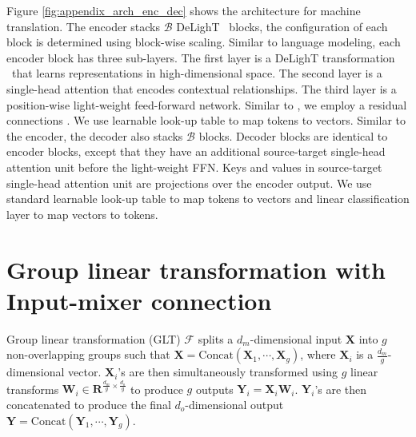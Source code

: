 \vspace{1mm}
 Figure \ref{fig:appendix_arch_enc_dec} shows the architecture for machine translation. The encoder stacks $\mathcal{B}$ DeLighT ~blocks, the configuration of each block is determined using block-wise scaling. Similar to language modeling, each encoder block has three sub-layers. The first layer is a DeLighT transformation ~that learns representations in high-dimensional space. The second layer is a single-head attention that encodes contextual relationships. The third layer is a position-wise light-weight feed-forward network. Similar to \citet{vaswani2017attention}, we employ a residual connections \citep{he2016deep}. We use learnable look-up table to map tokens to vectors. Similar to the encoder, the decoder also stacks  $\mathcal{B}$ blocks. Decoder blocks are identical to encoder blocks, except that they have an additional source-target single-head attention unit before the light-weight FFN. Keys and values in source-target single-head attention unit are projections over the encoder output. We use standard learnable look-up table to map tokens to vectors and linear classification layer to map vectors to tokens. 

\section{Group linear transformation with Input-mixer connection}
\label{sec:glt_explain}
Group linear transformation (GLT) $\mathcal{F}$ splits a $d_m$-dimensional input $\mathbf{X}$ into $g$ non-overlapping groups such that $\mathbf{X} = \text{Concat}(\mathbf{X}_1, \cdots, \mathbf{X}_g)$, where $\mathbf{X}_i$ is a $\frac{d_m}{g}$-dimensional vector. $\mathbf{X}_i$'s are then simultaneously transformed using $g$ linear transforms $\mathbf{W}_i \in \mathbf{R}^{\frac{d_m}{g} \times \frac{d_o}{g}}$ to produce $g$ outputs $\mathbf{Y}_i = \mathbf{X}_i \mathbf{W}_i$. $\mathbf{Y}_i$'s are then concatenated to produce the final $d_o$-dimensional output $\mathbf{Y} = \text{Concat}(\mathbf{Y}_1, \cdots, \mathbf{Y}_g)$. 

